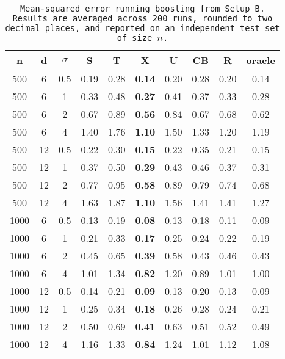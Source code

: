 \begin{table}[ht]
\centering
\begin{tabular}{cccccccccc}
  \hline
n & d & $\sigma$ & S & T & X & U & CB & R & oracle \\ 
  \hline
500 & 6 & 0.5 & 0.19 & 0.28 & \bf 0.14 & 0.20 & 0.28 & 0.20 & 0.14 \\ 
  500 & 6 & 1 & 0.33 & 0.48 & \bf 0.27 & 0.41 & 0.37 & 0.33 & 0.28 \\ 
  500 & 6 & 2 & 0.67 & 0.89 & \bf 0.56 & 0.84 & 0.67 & 0.68 & 0.62 \\ 
  500 & 6 & 4 & 1.40 & 1.76 & \bf 1.10 & 1.50 & 1.33 & 1.20 & 1.19 \\ 
  500 & 12 & 0.5 & 0.22 & 0.30 & \bf 0.15 & 0.22 & 0.35 & 0.21 & 0.15 \\ 
  500 & 12 & 1 & 0.37 & 0.50 & \bf 0.29 & 0.43 & 0.46 & 0.37 & 0.31 \\ 
  500 & 12 & 2 & 0.77 & 0.95 & \bf 0.58 & 0.89 & 0.79 & 0.74 & 0.68 \\ 
  500 & 12 & 4 & 1.63 & 1.87 & \bf 1.10 & 1.56 & 1.41 & 1.41 & 1.27 \\ 
  1000 & 6 & 0.5 & 0.13 & 0.19 & \bf 0.08 & 0.13 & 0.18 & 0.11 & 0.09 \\ 
  1000 & 6 & 1 & 0.21 & 0.33 & \bf 0.17 & 0.25 & 0.24 & 0.22 & 0.19 \\ 
  1000 & 6 & 2 & 0.45 & 0.65 & \bf 0.39 & 0.58 & 0.43 & 0.46 & 0.43 \\ 
  1000 & 6 & 4 & 1.01 & 1.34 & \bf 0.82 & 1.20 & 0.89 & 1.01 & 1.00 \\ 
  1000 & 12 & 0.5 & 0.14 & 0.21 & \bf 0.09 & 0.13 & 0.20 & 0.13 & 0.09 \\ 
  1000 & 12 & 1 & 0.25 & 0.34 & \bf 0.18 & 0.26 & 0.28 & 0.24 & 0.21 \\ 
  1000 & 12 & 2 & 0.50 & 0.69 & \bf 0.41 & 0.63 & 0.51 & 0.52 & 0.49 \\ 
  1000 & 12 & 4 & 1.16 & 1.33 & \bf 0.84 & 1.24 & 1.01 & 1.12 & 1.08 \\ 
   \hline
\end{tabular}
\caption{\tt Mean-squared error running \texttt{boosting} from Setup B. Results are averaged across 200 runs, rounded to two decimal places, and reported on an independent test set of size $n$.} 
\label{table:setup2}
\end{table}
